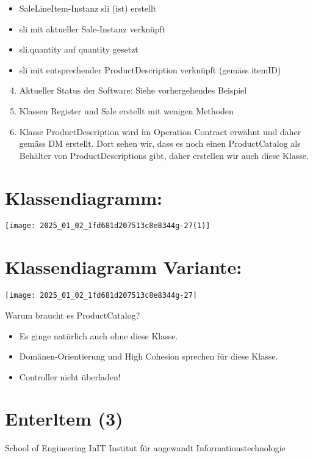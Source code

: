 \documentclass[10pt]{article}
\begin{document}
\begin{itemize}
  \item SaleLineItem-Instanz sli (ist) erstellt
  \item sli mit aktueller Sale-Instanz verknüpft
  \item sli.quantity auf quantity gesetzt
  \item sli mit entsprechender ProductDescription verknüpft (gemäss itemID)
\end{itemize}

\begin{enumerate}
  \setcounter{enumi}{3}
  \item Aktueller Status der Software: Siehe vorhergehendes Beispiel
  \item Klassen Register und Sale erstellt mit wenigen Methoden
  \item Klasse ProductDescription wird im Operation Contract erwähnt und daher gemäss DM erstellt. Dort sehen wir, dass es noch einen ProductCatalog als Behälter von ProductDescriptions gibt, daher erstellen wir auch diese Klasse.
\end{enumerate}

\section*{Klassendiagramm:}
\begin{center}
\texttt{[image: 2025\_01\_02\_1fd681d207513c8e8344g-27(1)]}
\end{center}

\section*{Klassendiagramm Variante:}
\begin{center}
\texttt{[image: 2025\_01\_02\_1fd681d207513c8e8344g-27]}
\end{center}

Warum braucht es ProductCatalog?

\begin{itemize}
  \item Es ginge natürlich auch ohne diese Klasse.
  \item Domänen-Orientierung und High Cohesion sprechen für diese Klasse.
  \item Controller nicht überladen!
\end{itemize}

\section*{Enterltem (3)}
School of Engineering InIT Institut für angewandt Informationstechnologie
\end{document}
